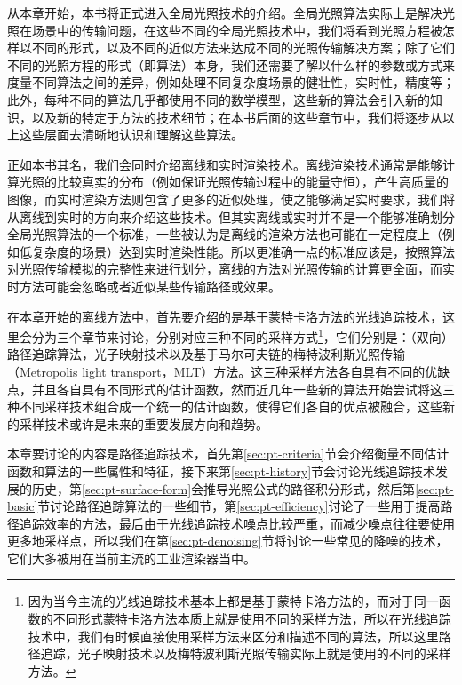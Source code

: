 从本章开始，本书将正式进入全局光照技术的介绍。全局光照算法实际上是解决光照在场景中的传输问题，在这些不同的全局光照技术中，我们将看到光照方程被怎样以不同的形式，以及不同的近似方法来达成不同的光照传输解决方案；除了它们不同的光照方程的形式（即算法）本身，我们还需要了解以什么样的参数或方式来度量不同算法之间的差异，例如处理不同复杂度场景的健壮性，实时性，精度等；此外，每种不同的算法几乎都使用不同的数学模型，这些新的算法会引入新的知识，以及新的特定于方法的技术细节；在本书后面的这些章节中，我们将逐步从以上这些层面去清晰地认识和理解这些算法。

正如本书其名，我们会同时介绍离线和实时渲染技术。离线渲染技术通常是能够计算光照的比较真实的分布（例如保证光照传输过程中的能量守恒），产生高质量的图像，而实时渲染方法则包含了更多的近似处理，使之能够满足实时要求，我们将从离线到实时的方向来介绍这些技术。但其实离线或实时并不是一个能够准确划分全局光照算法的一个标准，一些被认为是离线的渲染方法也可能在一定程度上（例如低复杂度的场景）达到实时渲染性能。所以更准确一点的标准应该是，按照算法对光照传输模拟的完整性来进行划分，离线的方法对光照传输的计算更全面，而实时方法可能会忽略或者近似某些传输路径或效果。

在本章开始的离线方法中，首先要介绍的是基于蒙特卡洛方法的光线追踪技术，这里会分为三个章节来讨论，分别对应三种不同的采样方式\footnote{因为当今主流的光线追踪技术基本上都是基于蒙特卡洛方法的，而对于同一函数的不同形式蒙特卡洛方法本质上就是使用不同的采样方法，所以在光线追踪技术中，我们有时候直接使用采样方法来区分和描述不同的算法，所以这里路径追踪，光子映射技术以及梅特波利斯光照传输实际上就是使用的不同的采样方法。}，它们分别是：（双向）路径追踪算法，光子映射技术以及基于马尔可夫链的梅特波利斯光照传输（Metropolis light transport，MLT）方法。这三种采样方法各自具有不同的优缺点，并且各自具有不同形式的估计函数，然而近几年一些新的算法开始尝试将这三种不同采样技术组合成一个统一的估计函数，使得它们各自的优点被融合，这些新的采样技术或许是未来的重要发展方向和趋势。

本章要讨论的内容是路径追踪技术，首先第\ref{sec:pt-criteria}节会介绍衡量不同估计函数和算法的一些属性和特征，接下来第\ref{sec:pt-history}节会讨论光线追踪技术发展的历史，第\ref{sec:pt-surface-form}会推导光照公式的路径积分形式，然后第\ref{sec:pt-basic}节讨论路径追踪算法的一些细节，第\ref{sec:pt-efficiency}讨论了一些用于提高路径追踪效率的方法，最后由于光线追踪技术噪点比较严重，而减少噪点往往要使用更多地采样点，所以我们在第\ref{sec:pt-denoising}节将讨论一些常见的降噪的技术，它们大多被用在当前主流的工业渲染器当中。






